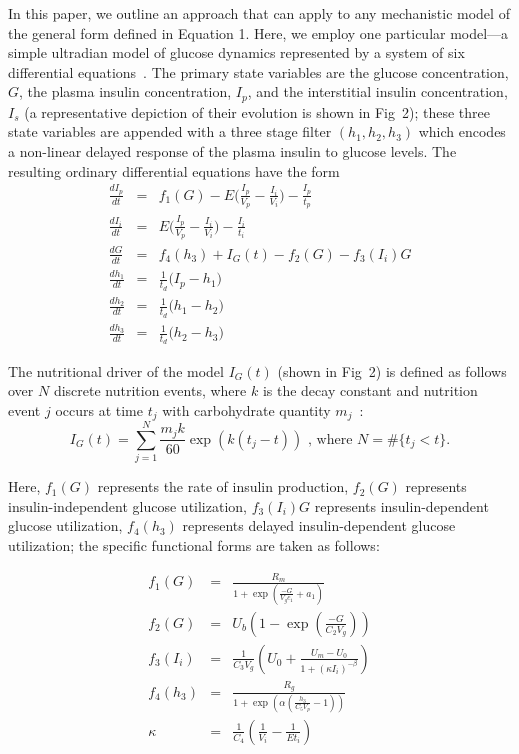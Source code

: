 \documentclass[10pt,letterpaper]{article}
\begin{document}
In this paper, we outline an approach that can apply to any mechanistic model of the general form defined in Equation 1.
Here, we employ one particular model---a simple ultradian model of glucose dynamics represented by a system of six differential equations~\cite{sturisUltradian,keener_mathematical_2009}. 
The primary state variables are the glucose concentration, $G$, the plasma insulin concentration, $I_{p}$, and the interstitial insulin concentration, $I_{s}$ (a representative depiction of their evolution is shown in Fig~2); these three state variables are appended
with a three stage filter $(h_1,h_2,h_3)$ which encodes a non-linear delayed response
of the plasma insulin to glucose levels. The resulting 
ordinary differential equations have the form
\begin{subequations}
\label{eq:modelUltradian}
\begin{eqnarray}
\frac{dI_p}{dt} & = &  f_1(G)-E\bigl(\frac{I_{p}}{V_{p}}-\frac{I_i}{V_{i}}\bigr)-\frac{I_{p}}{t_{p}}\\
\frac{dI_i}{dt} & = & E\bigl(\frac{I_{p}}{V_{p}}-\frac{I_i}{V_{i}}\bigr)-\frac{I_{i}}{t_{i}}\\
\frac{dG}{dt} & = & f_4(h_3)+I_{G}(t)-f_2(G)-f_3(I_i)G\\
\frac{dh_1}{dt} & = & \frac{1}{t_d}\bigl(I_p-h_1\bigr) \\
\frac{dh_2}{dt} & = & \frac{1}{t_d}\bigl(h_1-h_2\bigr) \\
\frac{dh_3}{dt} & = & \frac{1}{t_d}\bigl(h_2-h_3\bigr)
\end{eqnarray}
\end{subequations}

The nutritional driver of the model $I_G(t)$ (shown in Fig~2) is defined as follows over $N$ discrete nutrition events, where $k$ is the decay constant and nutrition event $j$ occurs at time $t_j$ with carbohydrate quantity $m_j$~\cite{albers_personalized_2017}:
\begin{equation}
I_G(t) = \sum^N_{j=1}{\frac{m_j k}{60}\exp(k(t_j-t))} \text{    , where } N=\#\{t_j<t\}.
\end{equation}

Here,
$f_1(G)$ represents the rate of insulin production,
$f_2(G)$ represents insulin-independent glucose utilization,
$f_3(I_i)G$ represents insulin-dependent glucose utilization,
$f_4(h_3)$ represents delayed insulin-dependent glucose utilization;
the specific functional forms are taken as follows:

\begin{eqnarray}
f_1(G) & = & \frac{R_m}{1+ \exp(\frac{-G}{V_g c_1} + a_1)} \\
f_2(G) & = & U_b(1-\exp(\frac{-G}{C_2V_g})) \\
f_3(I_i) & = & \frac{1}{C_3 V_g}( U_0 + \frac{U_m - U_0}{1 + (\kappa I_i)^{-\beta}}) \\
f_4(h_3) & = & \frac{R_g}{1 + \exp(\alpha (\frac{h_3}{C_5 V_p}  -1))} \\
\kappa & = & \frac{1}{C_4} (\frac{1}{V_i} - \frac{1}{E t_i})
\end{eqnarray}
\end{document}
